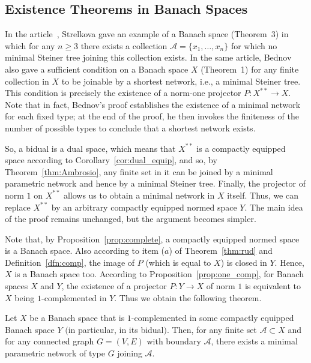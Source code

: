 \documentclass{svproc}
\begin{document}
\subsection{Existence Theorems in Banach Spaces}\label{sec:Banach}

In the article~\cite{Bednov}, Strelkova gave an example of a Banach space (Theorem~3) in which for any $n\ge 3$ there exists a collection $\mathcal{A} = \{x_1,\ldots , x_n\}$ for which no minimal Steiner tree joining this collection exists. In the same article, Bednov also gave a sufficient condition on a Banach space $X$ (Theorem~1) for any finite collection in $X$ to be joinable by a shortest network, i.e., a minimal Steiner tree. This condition is precisely the existence of a norm-one projector $P\colon X^{**}\rightarrow X$. Note that in fact, Bednov's proof establishes the existence of a minimal network for each fixed type; at the end of the proof, he then invokes the finiteness of the number of possible types to conclude that a shortest network exists.

So, a bidual is a dual space, which means that $X^{**}$ is a compactly equipped space according to Corollary~\ref{cor:dual_equip}, and so, by Theorem~\ref{thm:Ambrosio}, any finite set in it can be joined by a minimal parametric network and hence by a minimal Steiner tree. Finally, the projector of norm $1$ on $X^{**}$ allows us to obtain a minimal network in $X$ itself. Thus, we can replace $X^{**}$ by an arbitrary compactly equipped normed space $Y$. The main idea of the proof remains unchanged, but the argument becomes simpler.

Note that, by Proposition~\ref{prop:complete}, a compactly equipped normed space is a Banach space. Also according to item ($a$) of Theorem~\ref{thm:rud} and Definition~\ref{dfn:comp}, the image of $P$ (which is equal to $X$) is closed in $Y$. Hence, $X$ is a Banach space too. According to Proposition~\ref{prop:one_comp}, for Banach spaces $X$ and $Y$, the existence of a projector $P\colon Y\rightarrow X$ of norm $1$ is equivalent to $X$ being $1$-complemented in $Y$. Thus we obtain the following theorem.

\begin{theorem}\label{thm:gen}
Let $X$ be a Banach space that is $1$-complemented in some compactly equipped Banach space $Y$ $($in particular, in its bidual$)$. Then, for any finite set $\mathcal{A}\subset X$ and for any connected graph $G = (V, E)$ with boundary $\mathcal{A}$, there exists a minimal parametric network of type $G$ joining $\mathcal{A}$. 
\end{theorem}
\end{document}

